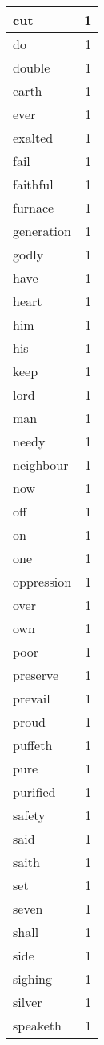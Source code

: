 \begin{center}
\begin{longtable}{l|r}
cut & 1 \\ \hline
do & 1 \\ \hline
double & 1 \\ \hline
earth & 1 \\ \hline
ever & 1 \\ \hline
exalted & 1 \\ \hline
fail & 1 \\ \hline
faithful & 1 \\ \hline
furnace & 1 \\ \hline
generation & 1 \\ \hline
godly & 1 \\ \hline
have & 1 \\ \hline
heart & 1 \\ \hline
him & 1 \\ \hline
his & 1 \\ \hline
keep & 1 \\ \hline
lord & 1 \\ \hline
man & 1 \\ \hline
needy & 1 \\ \hline
neighbour & 1 \\ \hline
now & 1 \\ \hline
off & 1 \\ \hline
on & 1 \\ \hline
one & 1 \\ \hline
oppression & 1 \\ \hline
over & 1 \\ \hline
own & 1 \\ \hline
poor & 1 \\ \hline
preserve & 1 \\ \hline
prevail & 1 \\ \hline
proud & 1 \\ \hline
puffeth & 1 \\ \hline
pure & 1 \\ \hline
purified & 1 \\ \hline
safety & 1 \\ \hline
said & 1 \\ \hline
saith & 1 \\ \hline
set & 1 \\ \hline
seven & 1 \\ \hline
shall & 1 \\ \hline
side & 1 \\ \hline
sighing & 1 \\ \hline
silver & 1 \\ \hline
speaketh & 1 \\ \hline

\end{longtable}
\end{center}

